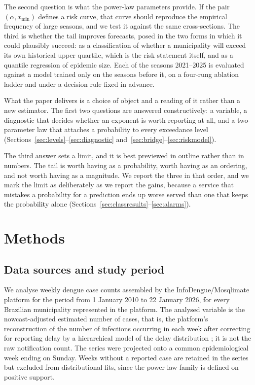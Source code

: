 \documentclass[english,10pt,b5paper]{article}
\begin{document}
The second question is what the power-law parameters provide. If the pair
$(\alpha, x_{\min})$ defines a risk curve, that curve should reproduce the
empirical frequency of large seasons, and we test it against the same
cross-sections. The third is whether the tail improves forecasts, posed in the
two forms in which it could plausibly succeed: as a classification of whether a
municipality will exceed its own historical upper quartile, which is the risk
statement itself, and as a quantile regression of epidemic size. Each of the
seasons 2021--2025 is evaluated against a model trained only on the seasons
before it, on a four-rung ablation ladder and under a decision rule fixed in
advance.

What the paper delivers is a choice of object and a reading of it rather than a
new estimator. The first two questions are answered constructively: a variable, a
diagnostic that decides whether an exponent is worth reporting at all, and a
two-parameter law that attaches a probability to every exceedance level
(Sections~\ref{sec:levels}--\ref{sec:diagnostic}
and~\ref{sec:bridge}--\ref{sec:riskmodel}).

The third answer sets a limit, and it is best previewed in outline rather than in
numbers. The tail is worth having as a probability, worth having as an ordering,
and not worth having as a magnitude. We report the three in that order, and we
mark the limit as deliberately as we report the gains, because a service that
mistakes a probability for a prediction ends up worse served than one that keeps
the probability alone
(Sections~\ref{sec:classresults}--\ref{sec:alarms}).

\section{Methods}

\subsection{Data sources and study period}
\label{sec:data}

We analyse weekly dengue case counts assembled by the InfoDengue/Mosqlimate
platform \citep{araujo2025large} for the period from 1 January 2010 to 22 January
2026, for every Brazilian municipality represented in the platform. The analysed
variable is the nowcast-adjusted estimated number of cases, that is, the
platform's reconstruction of the number of infections occurring in each week
after correcting for reporting delay by a hierarchical model of the delay
distribution \citep{bastos2019reporting}; it is not the raw notification count. The
series were projected onto a common epidemiological week ending on Sunday. Weeks
without a reported case are retained in the series but excluded from
distributional fits, since the power-law family is defined on positive support.
\end{document}
